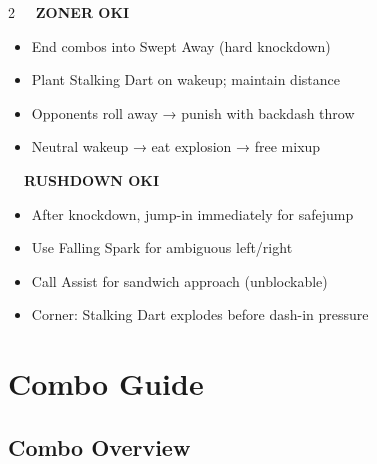 \documentclass[12pt, a4paper]{report}
\newcommand{\faFistRaised}{\ding{108}}
\newcommand{\faBookOpen}{\ding{70}}
\begin{document}
\begin{tcolorbox}[colback=sectionbg,colframe=ahriBlue!60,arc=5pt,boxrule=0.8pt,left=8pt,right=8pt,top=6pt,bottom=6pt]
\begin{multicols}{2}
\textcolor{ahriCyan}{\bfseries\sffamily\faBookOpen\ \ ZONER OKI}\\[4pt]
\begin{itemize}
  \item End combos into Swept Away (hard knockdown)
  \item Plant Stalking Dart on wakeup; maintain distance
  \item Opponents roll away → punish with backdash throw
  \item Neutral wakeup → eat explosion → free mixup
\end{itemize}
\columnbreak
\textcolor{ahriMagenta}{\bfseries\sffamily\faFistRaised\ \ RUSHDOWN OKI}\\[4pt]
\begin{itemize}
  \item After knockdown, jump-in immediately for safejump
  \item Use Falling Spark for ambiguous left/right
  \item Call Assist for sandwich approach (unblockable)
  \item Corner: Stalking Dart explodes before dash-in pressure
\end{itemize}
\end{multicols}
\end{tcolorbox}

\clearpage

\chapter{Combo Guide}

\section{Combo Overview}
\end{document}
